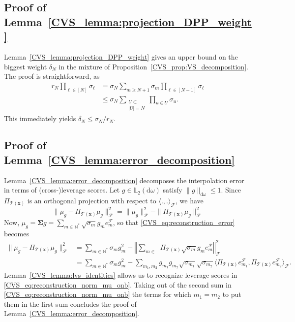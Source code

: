 \documentclass[twoside,11pt]{book}
\numberwithin{theorem}{chapter}
\numberwithin{definition}{chapter}
\numberwithin{proposition}{chapter}
\numberwithin{corollary}{chapter}
\numberwithin{example}{chapter}
\numberwithin{lemma}{chapter}
\numberwithin{assumption}{chapter}
\numberwithin{equation}{chapter}
\numberwithin{figure}{chapter}
\DeclareMathOperator{\F}{\mathcal{F}}
\def\Ltwo{\mathbb{L}_{2}(\mathrm{d} \omega)}
\DeclareMathOperator{\Ns}{\mathbb{N}^{*}}
\begin{document}
\subsection{Proof of Lemma~\ref{CVS_lemma:projection_DPP_weight}}
Lemma~\ref{CVS_lemma:projection_DPP_weight} gives an upper bound on the biggest weight $\delta_N$ in the mixture of Proposition~\ref{CVS_prop:VS_decomposition}. The proof is straightforward, as
\begin{align}\label{CVS_eq:r_N_delta_N_inequality}
r_{N} \prod\limits_{\ell \in [N]} \sigma_{\ell} & = \sigma_{N} \sum\limits_{m \geq N+1} \sigma_{m} \prod\limits_{\ell \in [N-1]} \sigma_{\ell} \nonumber\\
& \leq \sigma_{N} \sum\limits_{\substack{U \subset \Ns\\ |U| = N}} \prod\limits_{u \in U} \sigma_{u}.
\end{align}
This immediately yields $\delta_{N} \leq \sigma_{N}/r_{N}$.

\subsection{Proof of Lemma~\ref{CVS_lemma:error_decomposition}}\label{CVS_app:proof_error_decomposition}
Lemma~\ref{CVS_lemma:error_decomposition} decomposes the interpolation error in terms of (cross-)leverage scores. Let $g \in \Ltwo$ satisfy $\|g\|_{\mathrm{d}\omega} \leq 1$. Since $\Pi_{\mathcal{T}(\bm{x})}$ is an orthogonal projection with respect to $\langle .,. \rangle_{\F}$, we have
\begin{equation}\label{CVS_eq:reconstruction_error}
\|\mu_{g} - \Pi_{\mathcal{T}(\bm{x})} \mu_{g}\|_{\F}^{2} = \|\mu_{g}\|_{\F}^{2} - \| \Pi_{\mathcal{T}(\bm{x})} \mu_{g}\|_{\F}^2
\end{equation}
Now, $\mu_{g} = \bm{\Sigma} g = \sum\limits_{m \in \mathbb{N}^{*}} \sqrt{\sigma_{m}} g_{m} e_{m}^{\F}$, so that \eqref{CVS_eq:reconstruction_error} becomes
\begin{align}
\|\mu_{g} - \Pi_{\mathcal{T}(\bm{x})} \mu_{g}\|_{\F}^{2} & = \sum\limits_{m \in \mathbb{N}^{*}} \sigma_{m} g_{m}^{2} - \left\Vert \sum_{m \in \Ns} \Pi_{\mathcal{T}(\bm{x})}  \sqrt{\sigma_{m}} g_{m} e_{m}^{\F}\right\Vert_{\F}^2 \nonumber\\
& = \sum\limits_{m \in \mathbb{N}^{*}} \sigma_{m} g_{m}^{2} - \sum\limits_{m_{1}, m_2} g_{m_{1}} g_{m_{2}} \sqrt{\sigma_{m_{1}}} \sqrt{\sigma_{m_{2}}} \langle  \Pi_{\mathcal{T}(\bm{x})}   e_{m_{1}}^{\F}, \Pi_{\mathcal{T}(\bm{x})} e_{m_{2}}^{\F} \rangle_{\F}. \label{CVS_eq:reconstruction_norm_mu_onb}
\end{align}
Lemma~\ref{CVS_lemma:lvs_identities} allows us to recognize leverage scores in \eqref{CVS_eq:reconstruction_norm_mu_onb}. Taking out of the second sum in \eqref{CVS_eq:reconstruction_norm_mu_onb} the terms for which $m_1=m_2$ to put them in the first sum concludes the proof of Lemma~\ref{CVS_lemma:error_decomposition}.
\end{document}
